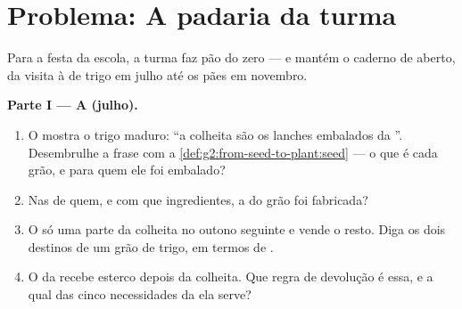 \section{Problema: A padaria da turma}

\begin{problem}\label{pb:g6:producing-our-food:1}
Para a festa da escola, a turma faz pão do zero --- e mantém o caderno
de  aberto, da visita à  de trigo em julho até os pães
em novembro.

\medskip\noindent\textbf{Parte I --- A  (julho).}
\begin{enumerate}
  \item O  mostra o trigo maduro: ``a colheita são os lanches
        embalados da ''. Desembrulhe a frase com a
        \cref{def:g2:from-seed-to-plant:seed} --- o que é cada grão, e
        para quem ele foi embalado?
  \item Nas  de quem, e com que ingredientes, a  do grão foi fabricada?
  \item O   só uma parte da colheita no outono seguinte
        e vende o resto. Diga os dois destinos de um grão de trigo,
        em termos de .
  \item O  da  recebe esterco depois da colheita. Que regra
        de devolução é essa, e a qual das cinco necessidades da
         ela serve?
\end{enumerate}


\end{problem}
